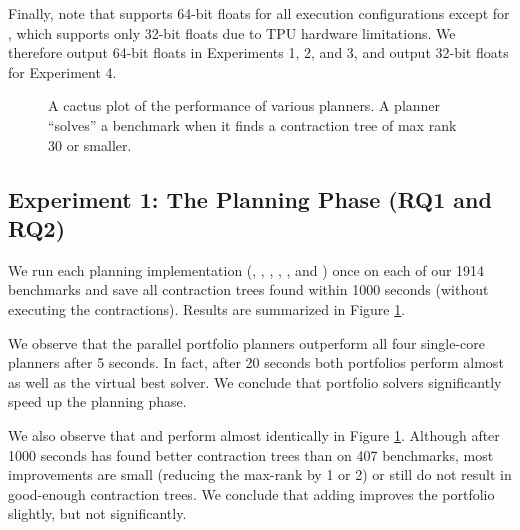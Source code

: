 Finally, note that  supports 64-bit floats for all execution configurations except for , which supports only 32-bit floats due to TPU hardware limitations. We therefore output 64-bit floats in Experiments 1, 2, and 3, and output 32-bit floats for Experiment 4.

\begin{figure}
	\centering
	
    \vspace*{-0.7cm}
	\caption{\label{fig:parallel:planning} A cactus plot of the performance of various planners. A planner ``solves'' a benchmark when it finds a contraction tree of max rank 30 or smaller.}
\end{figure}

\subsection{Experiment 1: The Planning Phase (RQ1 and RQ2)}
We run each planning implementation (, , , , , and ) once on each of our 1914 benchmarks and save all contraction trees found within 1000 seconds (without executing the contractions). Results are summarized in Figure \ref{fig:parallel:planning}. 


%


We observe that the parallel portfolio planners outperform all four single-core planners after 5 seconds. In fact, after 20 seconds both portfolios perform almost as well as the virtual best solver. We conclude that portfolio solvers significantly speed up the planning phase.

We also observe that  and  perform almost identically in Figure \ref{fig:parallel:planning}. Although after 1000 seconds  has found better contraction trees than  on 407 benchmarks, most improvements are small (reducing the max-rank by 1 or 2) or still do not result in good-enough contraction trees. We conclude that adding  improves the portfolio slightly, but not significantly.
 
